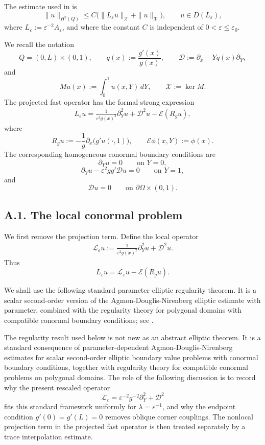 \documentclass[11pt]{article}
\theoremstyle{definition}
\theoremstyle{remark}
\numberwithin{equation}{section}
\begin{document}
The estimate used in  is
\begin{equation}
\label{eq:uniform-parameter-elliptic-estimate-app}
\|u\|_{H^2(Q)}
\le
C\bigl(
\|L_\varepsilon u\|_{\mathcal X}
+
\|u\|_{\mathcal X}
\bigr),
\qquad
u\in D(L_\varepsilon),
\end{equation}
where \(L_\varepsilon:=\varepsilon^{-2}A_\varepsilon\), and where the constant
\(C\) is independent of \(0<\varepsilon\le \varepsilon_0\).

We recall the notation
\[
Q=(0,L)\times(0,1),
\qquad
q(x):=\frac{g'(x)}{g(x)},
\qquad
\mathcal D:=\partial_x-Yq(x)\partial_Y,
\]
and
\[
Mu(x):=\int_0^1u(x,Y)\,dY,
\qquad
\mathcal X:=\ker M.
\]
The projected fast operator has the formal strong expression
\begin{align*}
  L_\varepsilon u
=
\frac1{\varepsilon^2g(x)^2}\partial_Y^2u
+
\mathcal D^2u
-
\mathcal E(R_gu),
\end{align*}
where
\[
R_gu
:=
-\frac1g\partial_x\bigl(g'u(\cdot,1)\bigr),
\qquad
\mathcal E\phi(x,Y):=\phi(x).
\]
The corresponding homogeneous conormal boundary conditions are
\[
\partial_Yu=0
\qquad\text{on }Y=0,
\]
\[
\partial_Yu-\varepsilon^2gg'\mathcal Du=0
\qquad\text{on }Y=1,
\]
and
\[
\mathcal Du=0
\qquad\text{on }\partial\Omega\times(0,1).
\]

\subsection*{A.1. The local conormal problem}

We first remove the projection term. Define the local operator
\begin{align}
\mathscr L_\varepsilon u
:=
\frac1{\varepsilon^2g(x)^2}\partial_Y^2u+\mathcal D^2u.
\label{eq:local-operator-appendix}
\end{align}
Thus
\[
L_\varepsilon u
=
\mathscr L_\varepsilon u-\mathcal E(R_gu).
\]

We shall use the following standard parameter-elliptic regularity theorem.
It is a scalar second-order version of the Agmon-Douglis-Nirenberg
elliptic estimate with parameter, combined with the regularity theory for
polygonal domains with compatible conormal boundary conditions; see
\cite{AgmonDouglisNirenberg1959,AgranovichVishik1964,Grisvard1985,McLean2000}.

The regularity result used below is not new as an abstract elliptic theorem.
It is a standard consequence of parameter-dependent
Agmon-Douglis-Nirenberg estimates for scalar second-order elliptic boundary
value problems with conormal boundary conditions, together with regularity
theory for compatible conormal problems on polygonal domains. The role of the
following discussion is to record why the present rescaled operator
\[
\mathscr L_\varepsilon
=
\varepsilon^{-2}g^{-2}\partial_Y^2+\mathcal D^2
\]
fits this standard framework uniformly for \(\lambda=\varepsilon^{-1}\), and
why the endpoint condition \(g'(0)=g'(L)=0\) removes oblique corner couplings.
The nonlocal projection term in the projected fast operator is then treated
separately by a trace interpolation estimate.
\end{document}
